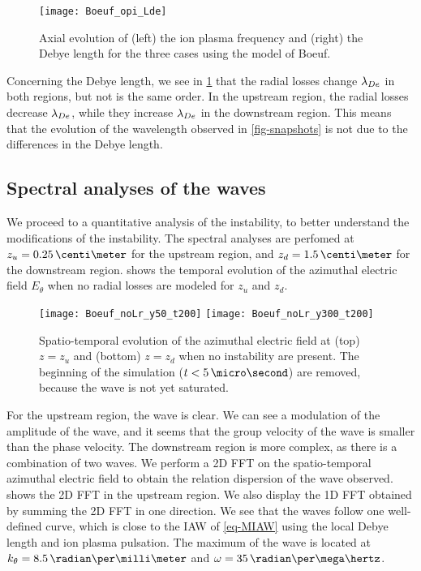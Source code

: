 \begin{figure}[hbtp]
  \centering
  \texttt{[image: Boeuf\_opi\_Lde]}
  \caption{Axial evolution of (left) the ion plasma frequency and (right) the Debye length for the three cases using the model of Boeuf.}
  \label{fig-wpi_Lde}
\end{figure}

Concerning the Debye length, we see in \cref{fig-wpi_Lde} that the radial losses change $\lambda_{De}$ in both regions, but not is the same order.
In the upstream region, the radial losses decrease $\lambda_{De}$, while they increase $\lambda_{De}$ in the downstream region.
This means that the evolution of the wavelength observed in \cref{fig-snapshots} is not due to the differences in the Debye length.

\subsection{Spectral analyses of the waves} \label{subsec-fft}

We proceed to a quantitative analysis of the instability, to better understand the modifications of the instability.
The spectral analyses are perfomed at $z_u=0.25\,\centi\meter$ for the upstream region, and $z_d=1.5\,\centi\meter$ for the downstream region.
 shows the temporal evolution of the azimuthal electric field $E_{\theta}$ when no radial losses are modeled for $z_u$ and $z_d$.

\begin{figure}[hbtp]
  \centering
  \texttt{[image: Boeuf\_noLr\_y50\_t200]}
  \texttt{[image: Boeuf\_noLr\_y300\_t200]}
  \caption{Spatio-temporal evolution of the azimuthal electric field at (top) $z=z_u$ and (bottom) $z=z_d$ when no instability are present. The beginning of the simulation ($t<5\,\micro\second$) are removed, because the wave is not yet saturated. }
  \label{fig-cut2D}
\end{figure}


For the upstream region, the wave is clear. 
We can see a modulation of the amplitude of the wave, and it seems that the group velocity of the wave is smaller than the phase velocity.
The downstream region is more complex, as there is a combination of two waves.
We perform a \ac{2D} \ac{FFT} on the spatio-temporal azimuthal electric field to obtain the relation dispersion of the wave observed.
 shows the \ac{2D} \ac{FFT} in the upstream region.
We also display the \ac{1D} \ac{FFT} obtained by summing the \ac{2D} \ac{FFT} in one direction.
We see that the waves follow one well-defined curve, which is close to the \ac{IAW} of \cref{eq-MIAW} using the local Debye length and ion plasma pulsation.
The maximum of the wave is located at $k_{\theta} = 8.5\,\radian\per\milli\meter$ and $\omega = 35\, \radian\per\mega\hertz$.

